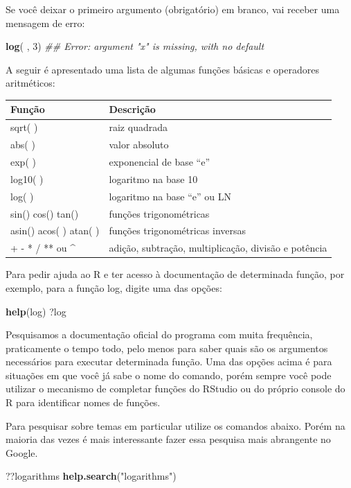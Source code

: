 \documentclass[
  11pt,
  a5paper,
  openany]{book}
\newenvironment{Shaded}{\begin{snugshade}}{\end{snugshade}}
\newcommand{\CommentTok}[1]{\textcolor[rgb]{0.56,0.35,0.01}{\textit{#1}}}
\newcommand{\DecValTok}[1]{\textcolor[rgb]{0.00,0.00,0.81}{#1}}
\newcommand{\KeywordTok}[1]{\textcolor[rgb]{0.13,0.29,0.53}{\textbf{#1}}}
\newcommand{\NormalTok}[1]{#1}
\newcommand{\StringTok}[1]{\textcolor[rgb]{0.31,0.60,0.02}{#1}}
\begin{document}
Se você deixar o primeiro argumento (obrigatório) em branco, vai receber uma mensagem de erro:

\begin{Shaded}
\begin{Highlighting}[]
\KeywordTok{log}\NormalTok{( , }\DecValTok{3}\NormalTok{)}
\CommentTok{## Error: argument "x" is missing, with no default}
\end{Highlighting}
\end{Shaded}

A seguir é apresentado uma lista de algumas funções básicas e operadores aritméticos:

\begin{longtable}[]{@{}ll@{}}
\toprule
Função & Descrição\tabularnewline
\midrule
\endhead
sqrt( ) & raiz quadrada\tabularnewline
abs( ) & valor absoluto\tabularnewline
exp( ) & exponencial de base ``e''\tabularnewline
log10( ) & logaritmo na base 10\tabularnewline
log( ) & logaritmo na base ``e'' ou LN\tabularnewline
sin() cos() tan() & funções trigonométricas\tabularnewline
asin() acos( ) atan( ) & funções trigonométricas inversas\tabularnewline
+ - * / ** ou \^{} & adição, subtração, multiplicação, divisão e potência\tabularnewline
\bottomrule
\end{longtable}

Para pedir ajuda ao R e ter acesso à documentação de determinada função, por exemplo, para a função log, digite uma das opções:

\begin{Shaded}
\begin{Highlighting}[]
\KeywordTok{help}\NormalTok{(log)           }
\NormalTok{?log}
\end{Highlighting}
\end{Shaded}

Pesquisamos a documentação oficial do programa com muita frequência, praticamente o tempo todo, pelo menos para saber quais são os argumentos necessários para executar determinada função. Uma das opções acima é para situações em que você já sabe o nome do comando, porém sempre você pode utilizar o mecanismo de completar funções do RStudio ou do próprio console do R para identificar nomes de funções.

Para pesquisar sobre temas em particular utilize os comandos abaixo. Porém na maioria das vezes é mais interessante fazer essa pesquisa mais abrangente no Google.

\begin{Shaded}
\begin{Highlighting}[]
\NormalTok{??logarithms}
\KeywordTok{help.search}\NormalTok{(}\StringTok{"logarithms"}\NormalTok{)}
\end{Highlighting}
\end{Shaded}
\end{document}
